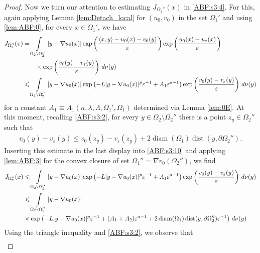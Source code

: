 \documentclass[reqno,12pt]{article}
\DeclareMathOperator{\dist}{dist}
\DeclareMathOperator{\diam}{diam}
\newcommand{\inner}[2]{\left\langle #1, #2 \right\rangle}
\newcommand{\I}{\int\limits}
\begin{document}
\begin{proof}
Now we turn our attention to estimating $J_{\Omega_{2}''}(x)$ in \eqref{ABF:s3:4}. For this, again applying Lemma \ref{lem:Detach_local} for $(u_0,v_0)$ in the set $\Omega_{1}'$ and using \eqref{lem:ABF:0}, for every $x\in \Omega_{1}'$, we have 
\begin{align}
    \label{ABF:s3:10}
    J_{\Omega_{2}''}(x) 
    &= 
    \I_{\Omega_{2}\setminus\Omega_{2}''} |y-\nabla u_{0}(x)|\exp\left(\frac{\inner{x}{y}-u_{0}(x)-v_{0}(y)}{\varepsilon}\right)
        \exp\left(\frac{u_0(x)-u_{\varepsilon}(x)}{\varepsilon}\right) 
    \notag\\&
    \qquad\times    
        \exp\left(\frac{v_0(y)-v_{\varepsilon}(y)}{\varepsilon}\right)\,d\nu(y)
    \notag\\&
    \leqslant
    \I_{\Omega_{2}\setminus\Omega_{2}''} |y-\nabla u_{0}(x)|\exp\left(-L|y-\nabla u_{0}(x)|^{p}\varepsilon^{-1} + A_{1}\varepsilon^{a-1}\right)
    \exp\left(\frac{v_0(y)-v_{\varepsilon}(y)}{\varepsilon}\right)\,d\nu(y)
\end{align}
for a constant $A_{1}\equiv A_{1}(n,\lambda,\Lambda,\Omega_{1}',\Omega_{1})$ determined via Lemma \ref{lem:0E}. At this moment, recalling \eqref{ABF:s3:2}, for every $y\in \Omega_{2}\setminus \Omega_{2}''$ there is a point $z_{y}\in \Omega_{2}''$ such that 
\begin{align*}
    v_{0}(y)-v_{\varepsilon}(y) \leqslant v_{0}(z_{y})-v_{\varepsilon}(z_{y}) + 2\diam(\Omega_{1})\dist(y,\partial\Omega_{2}'').
\end{align*}
Inserting this estimate in the last display into \eqref{ABF:s3:10} and applying \eqref{lem:ABF:3} for the convex closure of set $\Omega_{1}'' = \nabla v_{0} (\Omega_{2}'')$, we find 
\begin{align}
    \label{ABF:s3:12}
    J_{\Omega_{2}''}(x) 
    &\leqslant
    \I_{\Omega_{2}\setminus\Omega_{2}''} |y-\nabla u_{0}(x)|\exp\left(-L|y-\nabla u_{0}(x)|^{p}\varepsilon^{-1} + A_{1}\varepsilon^{a-1}\right)
    \exp\left(\frac{v_0(y)-v_{\varepsilon}(y)}{\varepsilon}\right)\,d\nu(y)
    \notag\\&
    \leqslant
    \I_{\Omega_{2}\setminus\Omega_{2}''} |y-\nabla u_{0}(x)|
     \notag\\&
    \times
    \exp\left(-L|y-\nabla u_{0}(x)|^{p}\varepsilon^{-1} + (A_{1}+A_{2})\varepsilon^{a-1} +2\diam(\Omega_{1})\dist(y,\partial\Omega_{2}'')\varepsilon^{-1}\right)
    \,d\nu(y)
\end{align}
Using the triangle inequality and \eqref{ABF:s3:2}, we observe that 
\begin{align*}

\end{align*}
\end{proof}
\end{document}
